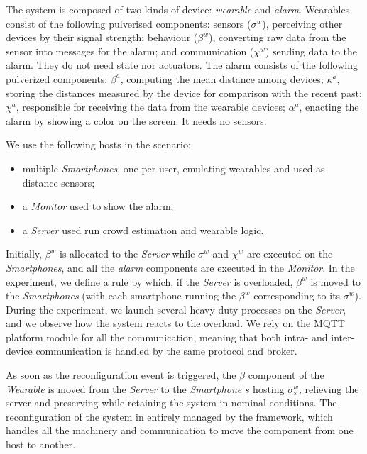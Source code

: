 \documentclass[conference]{IEEEtran}
\newcommand{\meta}[1]{{\color{blue}#1}}
\begin{document}
The system is composed of two kinds of device: \emph{wearable} and \emph{alarm}.
%
Wearables consist of the following pulverised components:
sensors ($\sigma^w$), perceiving other devices by their signal strength;
behaviour ($\beta^w$), converting raw data from the sensor into messages for the alarm; and
communication ($\chi^w$) sending data to the alarm.
%
They do not need state nor actuators.
%
The alarm consists of the following pulverized components:
$\beta^a$, computing the mean distance among devices;
$\kappa^a$, storing the distances measured by the device for comparison with the recent past;
$\chi^a$, responsible for receiving the data from the wearable devices;
$\alpha^a$, enacting the alarm by showing a color on the screen.
%
It needs no sensors.

We use the following hosts in the scenario:
\begin{itemize}
    \item multiple \emph{Smartphones}, one per user, emulating wearables and used as distance sensors;
    \item a \emph{Monitor} used to show the alarm;
    \item a \emph{Server} used run crowd estimation and wearable logic.
\end{itemize}

Initially, $\beta^{w}$ is allocated to the \emph{Server} while
$\sigma^{w}$ and $\chi^{w}$ are executed on the \emph{Smartphones},
and all the \emph{alarm} components are executed in the \emph{Monitor}.
%
In the experiment,
we define a rule by which,
if the \emph{Server} is overloaded,
$\beta^{w}$ is moved to the \emph{Smartphones}
(with each smartphone running the $\beta^{w}$ corresponding to its $\sigma^{w}$).
%
During the experiment,
we launch several heavy-duty processes on the \emph{Server},
and we observe how the system reacts to the overload.
%
We rely on the MQTT platform module for all the communication,
meaning that both intra- and inter-device communication is handled by the same protocol and broker.

As soon as the reconfiguration event is triggered,
the $\beta$ component of the \emph{Wearable} is moved from the \emph{Server} to the \emph{Smartphone} $s$ hosting $\sigma^{w}_{s}$,
relieving the server and preserving while retaining the system in nominal conditions.
%
The reconfiguration of the system in entirely managed by the framework,
which handles all the machinery and communication to move the component from
one host to another.
\end{document}
